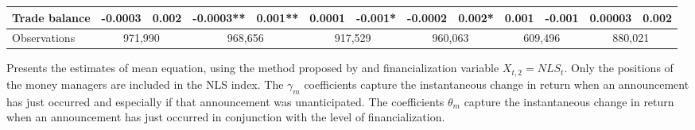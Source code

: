 \begin{landscape}
\begin{table}[]
{\begin{tabular}{lllllllllllll}
Trade balance            & -0.0003   & 0.002     & -0.0003**  & 0.001**  & 0.0001    & -0.001*   & -0.0002    & 0.002*   & 0.001     & -0.001    & 0.00003   & 0.002    \\ \hline
Observations &
  \multicolumn{2}{c}{971,990} &
  \multicolumn{2}{c}{968,656} &
  \multicolumn{2}{c}{917,529} &
  \multicolumn{2}{c}{960,063} &
  \multicolumn{2}{c}{609,496} &
  \multicolumn{2}{c}{880,021} \\ \hline
\end{tabular}%
}
    \singlespacing
        \footnotesize
      Presents the estimates of mean equation, using the method proposed by \citep{kurov2019price} and financialization variable $X_{t,2}=NLS_t$. Only the positions of the money managers are included in the NLS index. The $\gamma_m$ coefficients capture the instantaneous change in return when an announcement has just occurred and especially if that announcement was unanticipated. The coefficients $\theta_m$ capture the instantaneous change in return when an announcement has just occurred in conjunction with the level of financialization.
\end{table}
\end{landscape}

